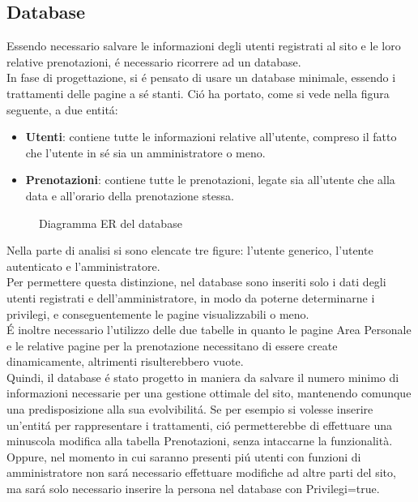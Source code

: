 \documentclass{article}
\begin{document}
\subsection{Database}
\label{subsec:database}
Essendo necessario salvare le informazioni degli utenti registrati al sito e le loro relative prenotazioni, é necessario ricorrere ad un database.\\
In fase di progettazione, si é pensato di usare un database minimale, essendo i trattamenti delle pagine a sé stanti. Ció ha portato, come si vede nella figura seguente, a due entitá:
\begin{itemize}
	\item \textbf{Utenti}: contiene tutte le informazioni relative all'utente, compreso il fatto che l'utente in sé sia un amministratore o meno.
	\item \textbf{Prenotazioni}: contiene tutte le prenotazioni, legate sia all'utente che alla data e all'orario della prenotazione stessa.
\end{itemize}

\begin{figure}[H]
	\centering
	\caption{Diagramma ER del database}
\end{figure}

Nella parte di analisi si sono elencate tre figure: l'utente generico, l'utente autenticato e l'amministratore.\\
Per permettere questa distinzione, nel database sono inseriti solo i dati degli utenti registrati e dell'amministratore, in modo da poterne determinarne i privilegi, e conseguentemente le pagine visualizzabili o meno.\\
É inoltre necessario l'utilizzo delle due tabelle in quanto le pagine Area Personale e le relative pagine per la prenotazione necessitano di essere create dinamicamente, altrimenti risulterebbero vuote.\\
Quindi, il database é stato progetto in maniera da salvare il numero minimo di informazioni necessarie per una gestione ottimale del sito, mantenendo comunque una predisposizione alla sua evolvibilitá. Se per esempio si volesse inserire un'entitá per rappresentare i trattamenti, ció permetterebbe di effettuare una minuscola modifica alla tabella Prenotazioni, senza intaccarne la funzionalità. Oppure, nel momento in cui saranno presenti piú utenti con funzioni di amministratore non sará necessario effettuare modifiche ad altre parti del sito, ma sará solo necessario inserire la persona nel database con Privilegi=true.
\end{document}
